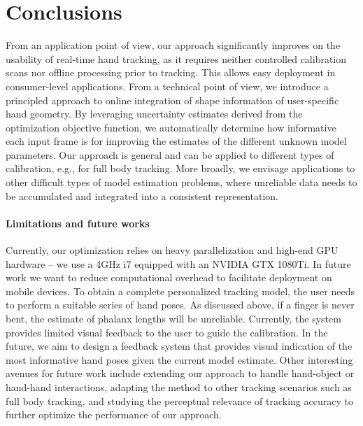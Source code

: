 
\section{Conclusions}
From an application point of view, our approach significantly improves on the usability of real-time hand tracking, as it requires neither controlled calibration scans nor offline processing prior to tracking. This allows easy deployment in consumer-level applications. From a technical point of view, we introduce a principled approach to online integration of shape information of user-specific hand geometry. By leveraging uncertainty estimates derived from the optimization objective function, we automatically determine how informative each input frame is for improving the estimates of the different unknown model parameters. Our approach is general and can be applied to different types of calibration, e.g., for full body tracking. More broadly, we envisage applications to other difficult types of model estimation problems, where unreliable data needs to be accumulated and integrated into a consistent representation. 

\paragraph{Limitations and future works}
Currently, our optimization relies on heavy parallelization and high-end GPU hardware -- we use a 4GHz i7 equipped with an NVIDIA GTX 1080Ti. In future work we want to reduce computational overhead to facilitate deployment on mobile devices.
To obtain a complete personalized tracking model, the user needs to perform a suitable series of hand poses. As discussed above, if a finger is never bent, the estimate of phalanx lengths will be unreliable. Currently, the system provides limited visual feedback to the user to guide the calibration. In the future, we aim to design a feedback system that provides visual indication of the most informative hand poses given the current model estimate. 
Other interesting avenues for future work include extending our approach to handle hand-object or hand-hand interactions, adapting the method to other tracking scenarios such as full body tracking, and studying the perceptual relevance of tracking accuracy to further optimize the performance of our approach.



